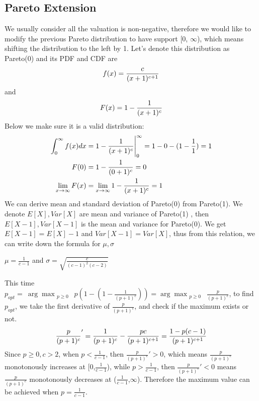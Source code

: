 \subsection{Pareto Extension}
We usually consider all the valuation is non-negative, therefore we would like to modify the previous Pareto distribution to have support [0,  $\infty$), which means shifting the distribution  to the left by 1. Let's denote this distribution as Pareto(0) and its PDF and CDF are
\begin{equation}\notag
f(x) = \frac{c}{(x+1)^{c+1}} 
\end{equation} 
and 
\begin{equation}\notag
F(x) = 1- \frac{1}{(x+1)^c}
\end{equation} 
Below we make sure it is a valid distribution:
\begin{align}\notag
	\int_{0}^{\infty} f(x) dx &= 1- \frac{1}{(x+1)^c} \Biggr|_{0}^{\infty}  = 1 - 0 -(1-\frac{1}{1}) = 1 \\ \notag  F(0) &= 1- \frac{1}{(0+1)^c} =0 \\ \notag  \lim_{x \to \infty} F(x) &= \lim_{x \to \infty} 1- \frac{1}{(x+1)^c} = 1
\end{align}
We can derive  mean and standard deviation of Pareto(0) from Pareto(1). We denote $E[X], Var[X]$ are mean and variance of Pareto(1) , then $E[X-1], Var[X-1]$ is the mean and variance for Pareto(0). We get $E[X-1] = E[X] - 1$ and $Var[X-1] = Var[X]$, thus from this relation, we can write down the formula for $\mu, \sigma$
\begin{center}
	$\mu = \frac{1}{c-1}$ \hspace{1cm} and \hspace{1cm}$\sigma = \sqrt{\frac{c}{(c-1)^2(c-2)}}$
\end{center}
This time $p_{opt} =\displaystyle\ \arg \max_{\substack{p \geqslant 0}} \  p(1 - (1-\frac{1}{(p+1)^c})) =\displaystyle\arg \max_{\substack{p \geqslant 0}} \  \frac{p}{(p+1)^c}$, to find $p_{opt}$, we take the first derivative of $\frac{p}{(p+1)^c}$, and check if the maximum exists or not.
\begin{equation}\notag
	\frac{p}{(p+1)^c}' = \frac{1}{(p+1)^c} - \frac{pc}{(p+1)^{c+1}} = \frac{1 - p(c-1)}{(p+1)^{c+1}}
\end{equation} 
Since $p \geqslant 0, c>2$, when $p < \frac{1}{c-1}$, then $\frac{p}{(p+1)^c}' > 0$, which means $\frac{p}{(p+1)^c}$ monotonously increases at [0,$\frac{1}{c-1}$), while $p > \frac{1}{c-1}$, then $\frac{p}{(p+1)^c}' < 0$ means $\frac{p}{(p+1)^c}$ monotonously decreases at ($\frac{1}{c-1}$,$\infty$). Therefore the maximum value can be achieved when $p = \frac{1}{c-1}$.

